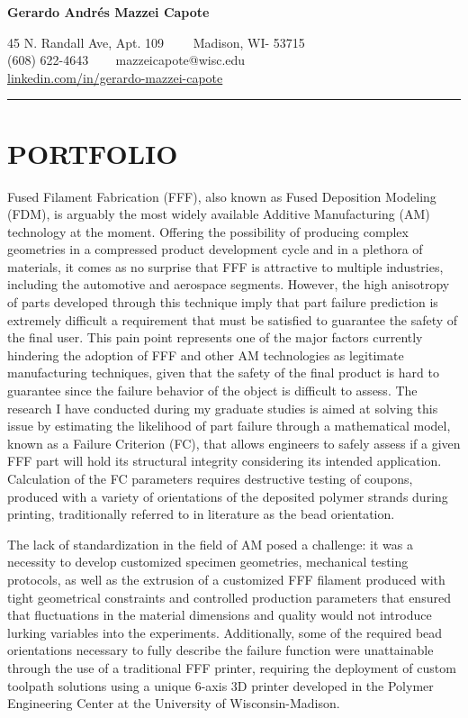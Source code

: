 \documentclass[11pt,letterpaper]{article}
\begin{document}
\begin{center}
	{\LARGE \textbf{Gerardo Andrés Mazzei Capote}}

	45 N. Randall Ave, Apt. 109\ \ \textbullet
	\ \ Madison, WI- 53715
	\\
	(608) 622-4643 \ \textbullet
	\ \ mazzeicapote@wisc.edu\\
	\href{https://www.linkedin.com/in/gerardo-mazzei-capote}{linkedin.com/in/gerardo-mazzei-capote}
	
\end{center}
\vspace{-0.5em}
\hrule
\vspace{0.4em}
\vspace{-1em}

\section*{PORTFOLIO}

Fused Filament Fabrication (FFF), also known as Fused Deposition Modeling (FDM), is arguably the most widely available Additive Manufacturing (AM) technology at the moment. Offering the possibility of producing complex geometries in a compressed product development cycle and in a plethora of materials, it comes as no surprise that FFF is attractive to multiple industries, including the automotive and aerospace segments. However, the high anisotropy of parts developed through this technique imply that part failure prediction is extremely difficult \textemdash a requirement that must be satisfied to guarantee the safety of the final user. This pain point represents one of the major factors currently hindering the adoption of FFF and other AM technologies as legitimate manufacturing techniques, given that the safety of the final product is hard to guarantee since the failure behavior of the object is difficult to assess. The research I have conducted during my graduate studies is aimed at solving this issue by estimating the likelihood of part failure through a mathematical model, known as a Failure Criterion (FC), that allows engineers to safely assess if a given FFF part will hold its structural integrity considering its intended application. Calculation of the FC parameters requires destructive testing of coupons, produced with a variety of orientations of the deposited polymer strands during printing, traditionally referred to in literature as the bead orientation.

The lack of standardization in the field of AM posed a challenge: it was a necessity to develop customized specimen geometries, mechanical testing protocols, as well as the extrusion of a customized FFF filament produced with tight geometrical constraints and controlled production parameters that ensured that fluctuations in the material dimensions and quality would not introduce lurking variables into the experiments. Additionally, some of the required bead orientations necessary to fully describe the failure function were unattainable through the use of a traditional FFF printer, requiring the deployment of custom toolpath solutions using a unique 6-axis 3D printer developed in the Polymer Engineering Center at the University of Wisconsin-Madison.
\end{document}
